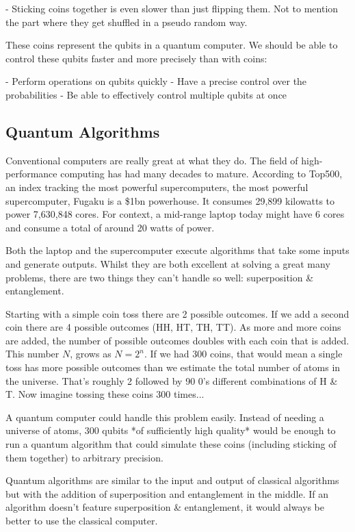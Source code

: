 \documentclass{book}
\begin{document}
- Sticking coins together is even slower than just flipping them. Not to mention the part where they get shuffled in a pseudo random way. 


These coins represent the qubits in a quantum computer. We should be able to control these qubits faster and more precisely than with coins:

- Perform operations on qubits quickly 
- Have a precise control over the probabilities 
- Be able to effectively control multiple qubits at once 

\subsection{Quantum Algorithms} 

 Conventional computers are really great at what they do. The field of high-performance computing has had many decades to mature. According to Top500, an index tracking the most powerful supercomputers, the most powerful supercomputer, Fugaku is a \$1bn powerhouse. It consumes 29,899 kilowatts to power 7,630,848 cores. For context, a mid-range laptop today might have 6 cores and consume a total of around 20 watts of power. 

 Both the laptop and the supercomputer execute algorithms that take some inputs and generate outputs. Whilst they are both excellent at solving a great many problems, there are two things they can't handle so well: superposition & entanglement. 

 Starting with a simple coin toss there are 2 possible outcomes. If we add a second coin there are 4 possible outcomes (HH, HT, TH, TT). As more and more coins are added, the number of possible outcomes doubles with each coin that is added. This number $N$, grows as $N = 2^n$. If we had 300 coins, that would mean a single toss has more possible outcomes than we estimate the total number of atoms in the universe. That's roughly 2 followed by 90 0's different combinations of H & T. Now imagine tossing these coins 300 times...

 A quantum computer could handle this problem easily. Instead of needing a universe of atoms, 300 qubits *of sufficiently high quality* would be enough to run a quantum algorithm that could simulate these coins (including sticking of them together) to arbitrary precision. 

 Quantum algorithms are similar to the input and output of classical algorithms but with the addition of superposition and entanglement in the middle.  If an algorithm doesn't feature superposition & entanglement, it would always be better to use the classical computer. 
\end{document}
